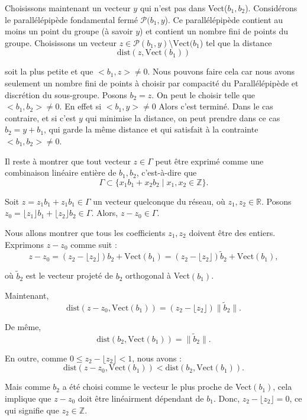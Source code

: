 Choisissons maintenant un vecteur $y$ qui n'est pas dans Vect($b_1, b_2$).
Consid{\'e}rons le parall{\'e}l{\'e}pip{\`e}de fondamental ferm{\'e}
$\mathcal{P}(b_1, y$). Ce parall{\'e}l{\'e}pip{\`e}de contient au moins un
point du groupe ({\`a} savoir $y$) et contient un nombre fini de points du
groupe. Choisissons un vecteur $z \in \mathcal{P}(b_1, y) \setminus
\text{Vect} (b_1$) tel que la distance
\[ \text{dist} (z, \text{Vect} (b_1)) \]


soit la plus petite et que $< b_1, z > \neq 0$. Nous pouvons faire cela car
nous avons seulement un nombre fini de points {\`a} choisir par compacit{\'e}
du Parall{\'e}l{\'e}pip{\`e}de et discr{\'e}tion du sous-groupe. Posons $b_2 =
z$. On peut le choisir telle que $< b_1, b_2 > \neq 0$. En effet si $< b_1, y
> \neq 0$ Alors c'est termin{\'e}. Dans le cas contraire, et si c'est $y$ qui
minimise la distance, on peut prendre dans ce cas $b_2 = y + b_1$, qui garde
la m{\^e}me distance et qui satisfait {\`a} la contrainte $< b_1, b_2 > \neq
0$.

Il reste {\`a} montrer que tout vecteur $z \in \Gamma$ peut {\^e}tre
exprim{\'e} comme une combinaison lin{\'e}aire enti{\`e}re de $b_1, b_2$,
c'est-{\`a}-dire que
\[ \Gamma \subset \{ x_1 b_1 + x_2 b_2 \mid x_1, x_2 \in \mathbb{Z} \} . \]


Soit $z = z_1 b_1 + z_1 b_1 \in \Gamma$ un vecteur quelconque du r{\'e}seau,
o{\`u} $z_1, z_2 \in \mathbb{R}$. Posons $z_0 = \lfloor z_1 \rfloor b_1 +
\lfloor z_2 \rfloor b_2 \in \Gamma$. Alors, $z - z_0 \in \Gamma$.

Nous allons montrer que tous les coefficients $z_1, z_2$ doivent {\^e}tre des
entiers. Exprimons $z - z_0$ comme suit :
\[ z - z_0 = (z_2 - \lfloor z_2 \rfloor) b_2 + \text{Vect} (b_1) = (z_2 -
   \lfloor z_2 \rfloor) \tilde{b}_2 + \text{Vect} (b_1), \]


o{\`u} $\tilde{b}_2$ est le vecteur projet{\'e} de $b_2$ orthogonal {\`a}
Vect$(b_1)$.

Maintenant,
\[ \text{dist} (z - z_0, \text{Vect} (b_1)) = (z_2 - \lfloor z_2 \rfloor)\|
   \tilde{b}_2 \|. \]


De m{\^e}me,
\[ \text{dist} (b_2, \text{Vect} (b_1)) =\| \tilde{b}_2 \|. \]


En outre, comme $0 \leq z_2 - \lfloor z_2 \rfloor < 1$, nous avons :
\[ \text{dist} (z - z_0, \text{Vect} (b_1)) < \text{dist} (b_2, \text{Vect}
   (b_1)) . \]


Mais comme $b_2$ a {\'e}t{\'e} choisi comme le vecteur le plus proche de
Vect$(b_1)$, cela implique que $z - z_0$ doit {\^e}tre lin{\'e}airment
d{\'e}pendant de $b_1$. Donc, $z_2 - \lfloor z_2 \rfloor = 0$, ce qui signifie
que $z_2 \in \mathbb{Z}$.

